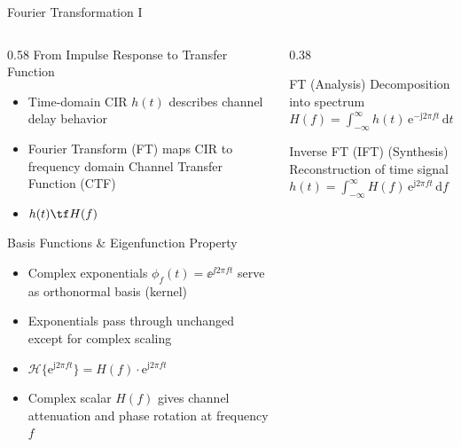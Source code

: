 \begin{frame}{Fourier Transformation I}
    \begin{columns}[T,onlytextwidth]
        \begin{column}{0.58\textwidth}
            From Impulse Response to Transfer Function\\
            \begin{itemize}
                \item Time-domain CIR $h(t)$ describes channel delay behavior
                \item Fourier Transform (FT) maps CIR to frequency domain Channel Transfer Function (CTF)
                \item $h(t) \tf H(f)$
            \end{itemize}
            Basis Functions \& Eigenfunction Property\\
            \begin{itemize}
                \item Complex exponentials $\phi_f(t) = \ee^{\jj 2\pi f t}$ serve as orthonormal basis (kernel)
                \item Exponentials pass through unchanged except for complex scaling
                \item $\mathcal{H}\{\mathrm{e}^{\mathrm{j} 2\pi f t}\} = H(f) \cdot \mathrm{e}^{\mathrm{j} 2\pi f t}$
                \item Complex scalar $H(f)$ gives channel attenuation and phase rotation at frequency $f$
            \end{itemize}
        \end{column}
    
        \begin{column}{0.38\textwidth}
            \begin{block}{FT (Analysis)}
                Decomposition into spectrum\\
                \vspace{0.5em}
                \centering
                $H(f) = \int_{-\infty}^{\infty} h(t) \,\mathrm{e}^{-\mathrm{j} 2\pi f t} \,\mathrm{d}t$
            \end{block}
    
            \begin{block}{Inverse FT (IFT) (Synthesis)}
                Reconstruction of time signal\\
                \vspace{0.5em}
                \centering
                $h(t) = \int_{-\infty}^{\infty} H(f) \,\mathrm{e}^{\mathrm{j} 2\pi f t} \,\mathrm{d}f$
            \end{block}
        \end{column}
    \end{columns}
\end{frame}

